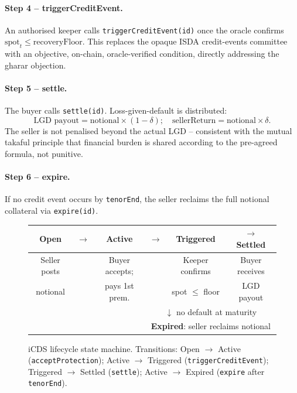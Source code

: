\documentclass[12pt]{article}
\theoremstyle{plain}
\theoremstyle{definition}
\theoremstyle{remark}
\begin{document}
\paragraph{Step 4 -- triggerCreditEvent.}
An authorised keeper calls \texttt{triggerCreditEvent(id)} once the oracle
confirms $\text{spot}_t \leq \text{recoveryFloor}$.
This replaces the opaque ISDA credit-events committee with an objective,
on-chain, oracle-verified condition, directly addressing the gharar objection.

\paragraph{Step 5 -- settle.}
The buyer calls \texttt{settle(id)}.
Loss-given-default is distributed:
\begin{equation}
  \text{LGD payout} = \text{notional} \times (1 - \delta); \quad
  \text{sellerReturn} = \text{notional} \times \delta.
\end{equation}
The seller is not penalised beyond the actual LGD -- consistent with the
mutual takaful principle that financial burden is shared according to the
pre-agreed formula, not punitive.

\paragraph{Step 6 -- expire.}
If no credit event occurs by \texttt{tenorEnd}, the seller reclaims the full
notional collateral via \texttt{expire(id)}.

\begin{figure}[htbp]
  \centering
  \small
  \begin{tabular}{|c|c|c|c|c|c|}
  \hline
  \textbf{Open} & $\to$ & \textbf{Active} & $\to$ & \textbf{Triggered} & $\to$ \textbf{Settled} \\
  \hline
  Seller posts & & Buyer accepts; & & Keeper confirms & Buyer receives \\
  notional & & pays 1st prem. & & spot $\leq$ floor & LGD payout \\
  \hline
  \multicolumn{3}{|c|}{} & \multicolumn{3}{c|}{$\downarrow$ no default at maturity} \\
  \hline
  \multicolumn{3}{|c|}{} & \multicolumn{3}{c|}{\textbf{Expired}: seller reclaims notional} \\
  \hline
  \end{tabular}
  \caption{iCDS lifecycle state machine.
           Transitions: Open $\to$ Active (\texttt{acceptProtection});
           Active $\to$ Triggered (\texttt{triggerCreditEvent});
           Triggered $\to$ Settled (\texttt{settle});
           Active $\to$ Expired (\texttt{expire} after \texttt{tenorEnd}).}
  \label{fig:lifecycle}
\end{figure}
\end{document}
